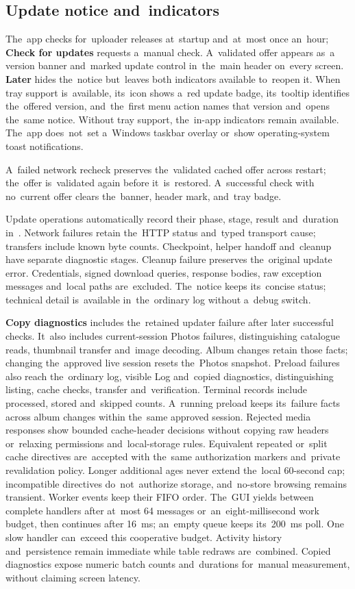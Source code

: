 \documentclass[11pt,a4paper]{article}
\newcommand{\ui}[1]{\textbf{#1}}
\begin{document}
\subsection{Update notice and~indicators}

The~app checks for~uploader releases at~startup and~at~most once an~hour;
\ui{Check for updates} requests a~manual check. A~validated offer appears as~a
version banner and~marked update control in~the~main header on~every screen.
\ui{Later} hides the~notice but~leaves both indicators available to~reopen it.
When tray support is~available, its~icon shows a~red update badge, its~tooltip
identifies the~offered version, and~the~first menu action names that version
and~opens the~same notice. Without tray support, the~in-app indicators remain
available. The~app does~not~set a~Windows taskbar overlay or~show
operating-system toast notifications.

A~failed network recheck preserves the~validated cached offer across restart;
the~offer is~validated again before it~is~restored. A~successful check with
no~current offer clears the~banner, header mark, and~tray badge.

Update operations automatically record their phase, stage, result and~duration
in~. Network failures retain the~HTTP status and~typed
transport cause; transfers include known byte counts. Checkpoint, helper
handoff and~cleanup have separate diagnostic stages. Cleanup failure preserves
the~original update error. Credentials, signed download queries, response
bodies, raw exception messages and~local paths are~excluded. The~notice keeps
its~concise status; technical detail is~available in~the~ordinary log without
a~debug switch.

\ui{Copy diagnostics} includes the~retained updater failure after later
successful checks. It~also includes current-session Photos failures,
distinguishing catalogue reads, thumbnail transfer and~image decoding.
Album changes retain those facts; changing the~approved live session resets
the~Photos snapshot.
Preload failures also reach the~ordinary log, visible Log and~copied
diagnostics, distinguishing listing, cache checks, transfer and~verification.
Terminal records include processed, stored and~skipped counts. A~running
preload keeps its~failure facts across album changes within the~same approved
session. Rejected media responses show bounded cache-header decisions without
copying raw headers or~relaxing permissions and~local-storage rules.
Equivalent repeated or~split cache directives are~accepted with the~same
authorization markers and~private revalidation policy. Longer additional ages
never extend the~local 60-second cap; incompatible directives do~not~authorize
storage, and~no-store browsing remains transient.
Worker events keep their FIFO order. The~GUI yields between complete handlers
after at~most 64 messages or~an~eight-millisecond work budget, then continues
after 16~ms; an~empty queue keeps its~200~ms poll. One slow handler can~exceed
this cooperative budget. Activity history and~persistence remain immediate
while table redraws are~combined. Copied diagnostics expose numeric batch
counts and~durations for~manual measurement, without claiming screen latency.
\end{document}
